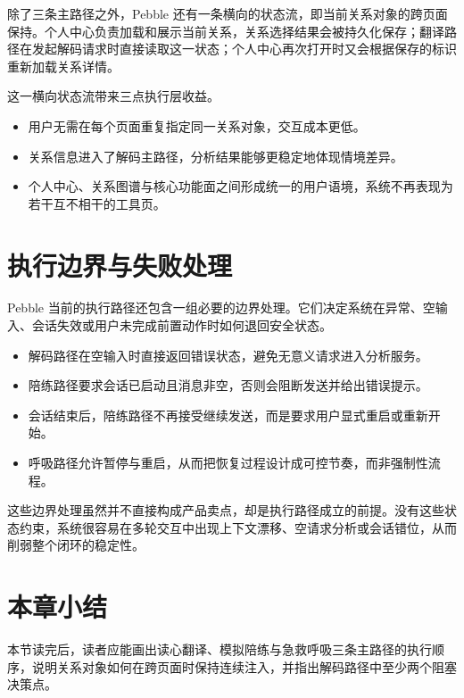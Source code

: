 除了三条主路径之外，Pebble 还有一条横向的状态流，即当前关系对象的跨页面保持。个人中心负责加载和展示当前关系，关系选择结果会被持久化保存；翻译路径在发起解码请求时直接读取这一状态；个人中心再次打开时又会根据保存的标识重新加载关系详情。

这一横向状态流带来三点执行层收益。

\begin{itemize}
  \item 用户无需在每个页面重复指定同一关系对象，交互成本更低。
  \item 关系信息进入了解码主路径，分析结果能够更稳定地体现情境差异。
  \item 个人中心、关系图谱与核心功能面之间形成统一的用户语境，系统不再表现为若干互不相干的工具页。
\end{itemize}

\section{执行边界与失败处理}

Pebble 当前的执行路径还包含一组必要的边界处理。它们决定系统在异常、空输入、会话失效或用户未完成前置动作时如何退回安全状态。

\begin{itemize}
  \item 解码路径在空输入时直接返回错误状态，避免无意义请求进入分析服务。
  \item 陪练路径要求会话已启动且消息非空，否则会阻断发送并给出错误提示。
  \item 会话结束后，陪练路径不再接受继续发送，而是要求用户显式重启或重新开始。
  \item 呼吸路径允许暂停与重启，从而把恢复过程设计成可控节奏，而非强制性流程。
\end{itemize}

这些边界处理虽然并不直接构成产品卖点，却是执行路径成立的前提。没有这些状态约束，系统很容易在多轮交互中出现上下文漂移、空请求分析或会话错位，从而削弱整个闭环的稳定性。

\section{本章小结}

本节读完后，读者应能画出读心翻译、模拟陪练与急救呼吸三条主路径的执行顺序，说明关系对象如何在跨页面时保持连续注入，并指出解码路径中至少两个阻塞决策点。
